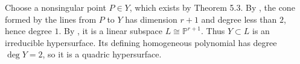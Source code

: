 Choose a nonsingular point $P\in Y$, which exists by Theorem 5.3. By , the cone formed by the lines from $P$ to $Y$ has dimension $r+1$ and degree less than $2$, hence degree $1$. By , it is a linear subspace $L\cong\mathbb{P}^{r+1}$. Thus $Y\subset L$ is an irreducible hypersurface. Its defining homogeneous polynomial has degree $\deg Y=2$, so it is a quadric hypersurface.
